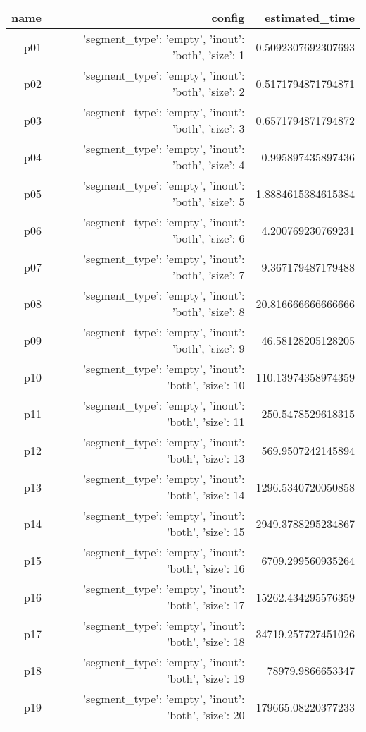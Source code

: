 \documentclass{article}
\begin{document}
                            \begin{center}
                            \scriptsize
                            \begin{tabular}{r|r|r}
                            name & config & estimated\_time\\\midrule
                              p01&{'segment\_type': 'empty', 'inout': 'both', 'size': 1}&0.5092307692307693\\
  p02&{'segment\_type': 'empty', 'inout': 'both', 'size': 2}&0.5171794871794871\\
  p03&{'segment\_type': 'empty', 'inout': 'both', 'size': 3}&0.6571794871794872\\
  p04&{'segment\_type': 'empty', 'inout': 'both', 'size': 4}&0.995897435897436\\
  p05&{'segment\_type': 'empty', 'inout': 'both', 'size': 5}&1.8884615384615384\\
  p06&{'segment\_type': 'empty', 'inout': 'both', 'size': 6}&4.200769230769231\\
  p07&{'segment\_type': 'empty', 'inout': 'both', 'size': 7}&9.367179487179488\\
  p08&{'segment\_type': 'empty', 'inout': 'both', 'size': 8}&20.816666666666666\\
  p09&{'segment\_type': 'empty', 'inout': 'both', 'size': 9}&46.58128205128205\\
  p10&{'segment\_type': 'empty', 'inout': 'both', 'size': 10}&110.13974358974359\\
  p11&{'segment\_type': 'empty', 'inout': 'both', 'size': 11}&250.5478529618315\\
  p12&{'segment\_type': 'empty', 'inout': 'both', 'size': 13}&569.9507242145894\\
  p13&{'segment\_type': 'empty', 'inout': 'both', 'size': 14}&1296.5340720050858\\
  p14&{'segment\_type': 'empty', 'inout': 'both', 'size': 15}&2949.3788295234867\\
  p15&{'segment\_type': 'empty', 'inout': 'both', 'size': 16}&6709.299560935264\\
  p16&{'segment\_type': 'empty', 'inout': 'both', 'size': 17}&15262.434295576359\\
  p17&{'segment\_type': 'empty', 'inout': 'both', 'size': 18}&34719.257727451026\\
  p18&{'segment\_type': 'empty', 'inout': 'both', 'size': 19}&78979.9866653347\\
  p19&{'segment\_type': 'empty', 'inout': 'both', 'size': 20}&179665.08220377233\\

\end{tabular}
\end{center}
\end{document}
